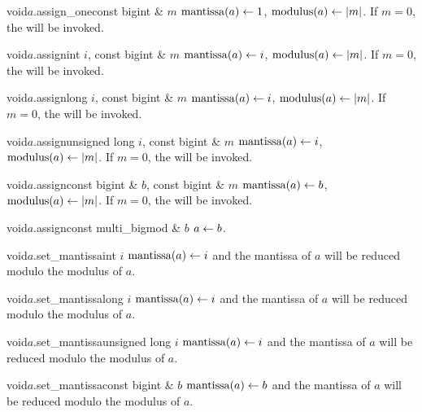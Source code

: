 \begin{fcode}{void}{$a$.assign_one}{const bigint & $m$}
  $\operatorname{mantissa}(a) \leftarrow 1$, $\operatorname{modulus}(a) \leftarrow |m|$.  If $m = 0$, the \LEH will be invoked.
\end{fcode}

\begin{fcode}{void}{$a$.assign}{int $i$, const bigint & $m$}
  $\operatorname{mantissa}(a) \leftarrow i$, $\operatorname{modulus}(a) \leftarrow |m|$.  If $m = 0$, the \LEH will be invoked.
\end{fcode}

\begin{fcode}{void}{$a$.assign}{long $i$, const bigint & $m$}
  $\operatorname{mantissa}(a) \leftarrow i$, $\operatorname{modulus}(a) \leftarrow |m|$.  If $m = 0$, the \LEH will be invoked.
\end{fcode}

\begin{fcode}{void}{$a$.assign}{unsigned long $i$, const bigint & $m$}
  $\operatorname{mantissa}(a) \leftarrow i$, $\operatorname{modulus}(a) \leftarrow |m|$.  If $m = 0$, the \LEH will be invoked.
\end{fcode}

\begin{fcode}{void}{$a$.assign}{const bigint & $b$, const bigint & $m$}
  $\operatorname{mantissa}(a) \leftarrow b$, $\operatorname{modulus}(a) \leftarrow |m|$.  If $m = 0$, the \LEH will be invoked.
\end{fcode}

\begin{fcode}{void}{$a$.assign}{const multi_bigmod & $b$}
  $a \leftarrow b$.
\end{fcode}

\begin{fcode}{void}{$a$.set_mantissa}{int $i$}
  $\operatorname{mantissa}(a) \leftarrow i$ and the mantissa of $a$ will be reduced modulo the modulus of $a$.
\end{fcode}

\begin{fcode}{void}{$a$.set_mantissa}{long $i$}
  $\operatorname{mantissa}(a) \leftarrow i$ and the mantissa of $a$ will be reduced modulo the modulus of $a$.
\end{fcode}

\begin{fcode}{void}{$a$.set_mantissa}{unsigned long $i$}
  $\operatorname{mantissa}(a) \leftarrow i$ and the mantissa of $a$ will be reduced modulo the modulus of $a$.
\end{fcode}

\begin{fcode}{void}{$a$.set_mantissa}{const bigint & $b$}
  $\operatorname{mantissa}(a) \leftarrow b$ and the mantissa of $a$ will be reduced modulo the modulus of $a$.
\end{fcode}

